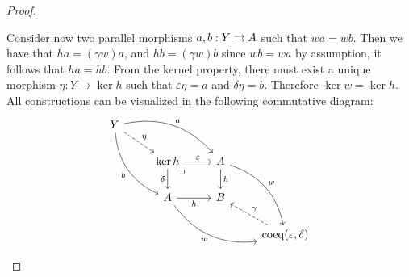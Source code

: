 \begin{proof}
\begin{enumerate}[(a)]
              Consider now two parallel morphisms \(a, b: Y \rightrightarrows A\) such that
              \(w a = w b\). Then we have that \(h a = (\gamma w) a\), and
              \(h b = (\gamma w) b\) since \(w b = w a\) by assumption, it follows that
              \(h a = h b\). From the kernel property, there must exist a unique morphism
              \(\eta: Y \to \ker h\) such that \(\varepsilon \eta = a\) and
              \(\delta \eta = b\). Therefore \(\ker w = \ker h\). All constructions can be
              visualized in the following commutative diagram:
              \[
                  \begin{tikzcd}
                      Y \ar[rd, dashed, "\eta"]
                      \ar[rrd, bend left, "a"]
                      \ar[drd, bend right, "b"'] & & &
                      \\
                      &\ker h \ar[r, "\varepsilon"]
                      \ar[rd, phantom, "\lrcorner", very near start]
                      \ar[d, "\delta"']
                      &A \ar[d, "h"] \ar[drd, bend left, "w"]
                      &
                      \\
                      &A \ar[r, "h"'] \ar[rrd, "w"', bend right]
                      &B
                      &
                      \\
                      & & &\Coeq(\varepsilon, \delta) \ar[lu, dashed, "\gamma"']
                  \end{tikzcd}
              \]
    \end{enumerate}
\end{proof}

